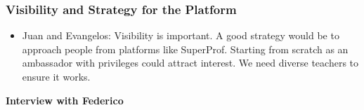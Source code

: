 \begin{enumerate}
\subsubsection*{Visibility and Strategy for the Platform}
\begin{itemize}
\item Juan and Evangelos: Visibility is important.
A good strategy would be to approach people from platforms like SuperProf.
Starting from scratch as an ambassador with privileges could attract interest.
We need diverse teachers to ensure it works.
\end{itemize}
\end{enumerate}

\item \textbf{Interview with Federico}

